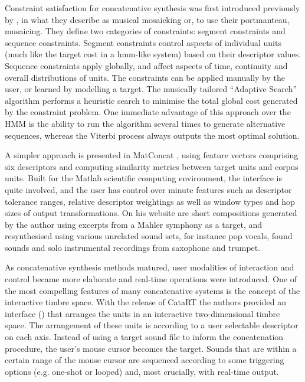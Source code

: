 Constraint satisfaction for concatenative synthesis was first introduced previously by \cite{Zils2001}, in what they describe as musical mosaicking or, to use their portmanteau, musaicing. They define two categories of constraints: segment constraints and sequence constraints. Segment constraints control aspects of individual units (much like the target cost in a \acrshort{hmm}-like system) based on their descriptor values. Sequence constraints apply globally, and affect aspects of time, continuity and overall distributions of units. The constraints can be applied manually by the user, or learned by modelling a target. The musically tailored “Adaptive Search” algorithm performs a heuristic search to minimise the total global cost generated by the constraint problem. One immediate advantage of this approach over the HMM is the ability to run the algorithm several times to generate alternative sequences, whereas the Viterbi process always outputs the most optimal solution.

 A simpler approach is presented in MatConcat \citep{Sturm2004}, using feature vectors comprising six descriptors and computing similarity metrics between target units and corpus units. Built for the Matlab scientific computing environment, the interface is quite involved, and the user has control over minute features such as descriptor tolerance ranges, relative descriptor weightings as well as window types and hop sizes of output transformations. On his website are short compositions generated by the author using excerpts from a Mahler symphony as a target, and resynthesised using various unrelated sound sets, for instance pop vocals, found sounds and solo instrumental recordings from saxophone and trumpet.

As concatenative synthesis methods matured, user modalities of interaction and control became more elaborate and real-time operations were introduced. One of the most compelling features of many concatenative systems is the concept of the interactive timbre space. With the release of CataRT \citep{Schwarz2006} the authors provided an interface () that arranges the units in an interactive two-dimensional timbre space. The arrangement of these units is according to a user selectable descriptor on each axis. Instead of using a target sound file to inform the concatenation procedure, the user’s mouse cursor becomes the target. Sounds that are within a certain range of the mouse cursor are sequenced according to some triggering options (e.g. one-shot or  looped) and, most crucially, with real-time output.

